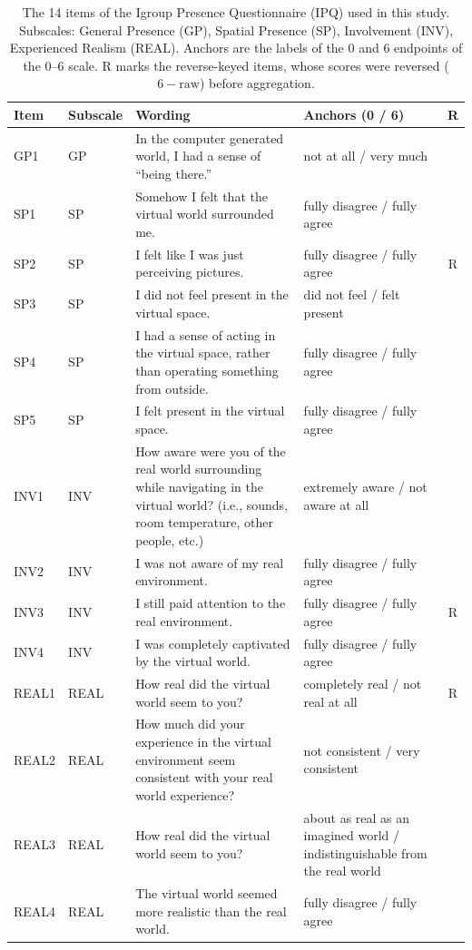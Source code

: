 \begin{table}[htbp]
\centering
\caption{The 14 items of the Igroup Presence Questionnaire (IPQ) used in this study. Subscales: General Presence (GP), Spatial Presence (SP), Involvement (INV), Experienced Realism (REAL). Anchors are the labels of the 0 and 6 endpoints of the 0--6 scale. R marks the reverse-keyed items, whose scores were reversed ($6-\text{raw}$) before aggregation.}
\label{tab:ipq_items}
\small
\begin{tabularx}{\textwidth}{llX>{\raggedright\arraybackslash}p{3.4cm}c}
\hline
Item & Subscale & Wording & Anchors (0 / 6) & R \\
\hline
GP1 & GP & In the computer generated world, I had a sense of ``being there.'' & not at all / very much & \\
SP1 & SP & Somehow I felt that the virtual world surrounded me. & fully disagree / fully agree & \\
SP2 & SP & I felt like I was just perceiving pictures. & fully disagree / fully agree & R \\
SP3 & SP & I did not feel present in the virtual space. & did not feel / felt present & \\
SP4 & SP & I had a sense of acting in the virtual space, rather than operating something from outside. & fully disagree / fully agree & \\
SP5 & SP & I felt present in the virtual space. & fully disagree / fully agree & \\
INV1 & INV & How aware were you of the real world surrounding while navigating in the virtual world? (i.e., sounds, room temperature, other people, etc.) & extremely aware / not aware at all & \\
INV2 & INV & I was not aware of my real environment. & fully disagree / fully agree & \\
INV3 & INV & I still paid attention to the real environment. & fully disagree / fully agree & R \\
INV4 & INV & I was completely captivated by the virtual world. & fully disagree / fully agree & \\
REAL1 & REAL & How real did the virtual world seem to you? & completely real / not real at all & R \\
REAL2 & REAL & How much did your experience in the virtual environment seem consistent with your real world experience? & not consistent / very consistent & \\
REAL3 & REAL & How real did the virtual world seem to you? & about as real as an imagined world / indistinguishable from the real world & \\
REAL4 & REAL & The virtual world seemed more realistic than the real world. & fully disagree / fully agree & \\
\hline
\end{tabularx}
\end{table}
